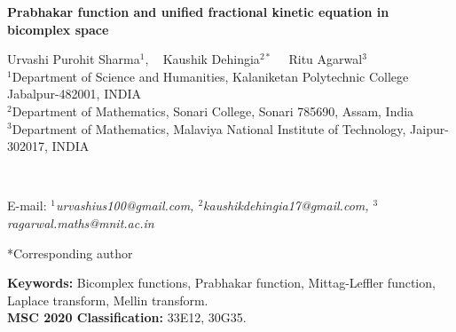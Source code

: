 \documentclass[a4paper,12pt]{article}
\theoremstyle{remark}
\begin{document}
		
\begin{center}
{{\Large \textbf {Prabhakar  function and unified fractional kinetic equation in bicomplex space    %
}}

			\medskip
			
			
			
			
{\sc  Urvashi Purohit Sharma$^{1},$\ \ Kaushik Dehingia$^{2*}$ \ \ Ritu Agarwal$^{3}$ }\\
{\footnotesize $^{1}$Department of Science and Humanities, Kalaniketan Polytechnic College Jabalpur-482001, INDIA}\\
{\footnotesize 
$^{2}$Department of Mathematics, Sonari College, Sonari 785690, Assam, India}\\
{  \footnotesize $^{3}$Department of Mathematics,
Malaviya National Institute of Technology, Jaipur-302017, INDIA}
}\\
{\footnotesize E-mail: {\it $^{1}$urvashius100@gmail.com, $^{2}$kaushikdehingia17@gmail.com, $^{3} $ragarwal.maths@mnit.ac.in}

*Corresponding author
}        \end{center}
\thispagestyle{empty}
	
	
\hrulefill
\begin{abstract}
\indent
The Mittag-Leffler type functions arise naturally in the solution of fractional order integral and differential equations, especially in the investigations of the fractional generalization of the kinetic equation. This article introduces a bicomplex extension of the Prabhakar function, a generalization of the Mittag-Leffler function commonly used in fractional calculus. We explore the analyticity and determine the region of convergence for this new bicomplex Prabhakar function. Several fundamental properties are established, including its integral representations, recurrence formulas, and differential relations. Furthermore, we compute the bicomplex Laplace and Mellin transforms of the function, which are useful for solving differential and integral equations. Finally, we analyze a fractional kinetic equation where the bicomplex Prabhakar function appears both in the equation and in its solution, demonstrating its applicability in complex systems involving fractional dynamics. 
	\end{abstract}
	\hrulefill
	
	
{\small \textbf{Keywords:} }Bicomplex functions, Prabhakar function, Mittag-Leffler function, Laplace transform, Mellin transform.\\ 
\textbf{MSC 2020 Classification:} 33E12, 30G35.\\
\end{document}
